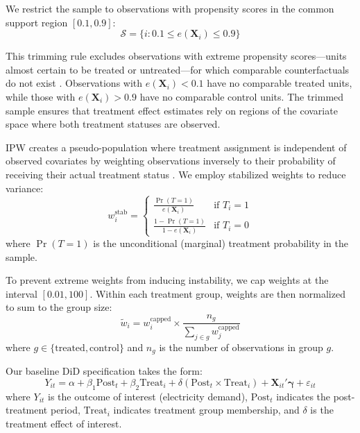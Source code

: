 \documentclass[sigconf]{acmart}
\begin{document}
We restrict the sample to observations with propensity scores in the common support region $[0.1, 0.9]$:
\begin{equation}
    \mathcal{S} = \{i : 0.1 \leq e(\mathbf{X}_i) \leq 0.9\}
\end{equation}

This trimming rule excludes observations with extreme propensity scores---units almost certain to be treated or untreated---for which comparable counterfactuals do not exist \citep{crump2009dealing}. Observations with $e(\mathbf{X}_i) < 0.1$ have no comparable treated units, while those with $e(\mathbf{X}_i) > 0.9$ have no comparable control units. The trimmed sample ensures that treatment effect estimates rely on regions of the covariate space where both treatment statuses are observed.

IPW creates a pseudo-population where treatment assignment is independent of observed covariates by weighting observations inversely to their probability of receiving their actual treatment status \citep{hirano2003efficient}. We employ stabilized weights to reduce variance:
\begin{equation}
    w_i^{\text{stab}} = \begin{cases}
        \displaystyle\frac{\Pr(T=1)}{e(\mathbf{X}_i)} & \text{if } T_i = 1 \\[10pt]
        \displaystyle\frac{1 - \Pr(T=1)}{1 - e(\mathbf{X}_i)} & \text{if } T_i = 0
    \end{cases}
\end{equation}
where $\Pr(T=1)$ is the unconditional (marginal) treatment probability in the sample.

To prevent extreme weights from inducing instability, we cap weights at the interval $[0.01, 100]$. Within each treatment group, weights are then normalized to sum to the group size:
\begin{equation}
    \tilde{w}_i = w_i^{\text{capped}} \times \frac{n_g}{\sum_{j \in g} w_j^{\text{capped}}}
\end{equation}
where $g \in \{\text{treated}, \text{control}\}$ and $n_g$ is the number of observations in group $g$.

Our baseline DiD specification takes the form:
\begin{equation}
    Y_{it} = \alpha + \beta_1 \text{Post}_t + \beta_2 \text{Treat}_i + \delta (\text{Post}_t \times \text{Treat}_i) + \mathbf{X}_{it}'\boldsymbol{\gamma} + \varepsilon_{it}
\end{equation}
where $Y_{it}$ is the outcome of interest (electricity demand), $\text{Post}_t$ indicates the post-treatment period, $\text{Treat}_i$ indicates treatment group membership, and $\delta$ is the treatment effect of interest.
\end{document}
